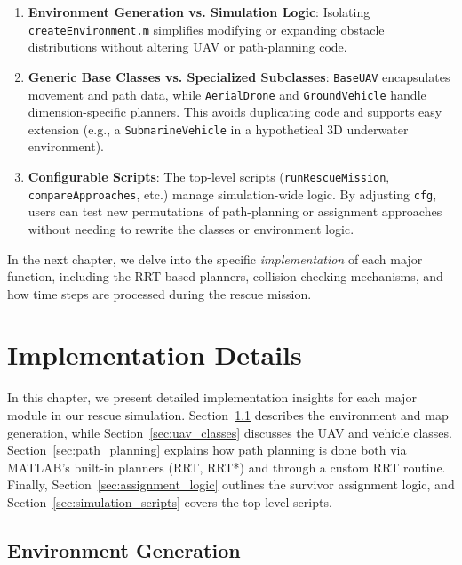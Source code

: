 \documentclass[12pt,a4paper]{report}
\begin{document}
\begin{enumerate}
    \item \textbf{Environment Generation vs. Simulation Logic}: 
          Isolating \texttt{createEnvironment.m} simplifies modifying or expanding
          obstacle distributions without altering UAV or path-planning code.
    \item \textbf{Generic Base Classes vs. Specialized Subclasses}: 
          \texttt{BaseUAV} encapsulates movement and path data, while \texttt{AerialDrone}
          and \texttt{GroundVehicle} handle dimension-specific planners. This avoids
          duplicating code and supports easy extension (e.g., a \texttt{SubmarineVehicle}
          in a hypothetical 3D underwater environment).
    \item \textbf{Configurable Scripts}: 
          The top-level scripts (\texttt{runRescueMission}, \texttt{compareApproaches},
          etc.) manage simulation-wide logic. By adjusting \texttt{cfg}, users can test
          new permutations of path-planning or assignment approaches without needing
          to rewrite the classes or environment logic.
\end{enumerate}

\noindent 
In the next chapter, we delve into the specific \emph{implementation} of each major
function, including the RRT-based planners, collision-checking mechanisms, and how time steps
are processed during the rescue mission.

\chapter{Implementation Details}
\label{cha:implementation}

In this chapter, we present detailed implementation insights for each major module 
in our rescue simulation. Section~\ref{sec:env_generation} describes the environment 
and map generation, while Section~\ref{sec:uav_classes} discusses the UAV and vehicle 
classes. Section~\ref{sec:path_planning} explains how path planning is done both via 
MATLAB’s built-in planners (RRT, RRT*) and through a custom RRT routine. Finally, 
Section~\ref{sec:assignment_logic} outlines the survivor assignment logic, and 
Section~\ref{sec:simulation_scripts} covers the top-level scripts.

\section{Environment Generation}
\label{sec:env_generation}
\end{document}

